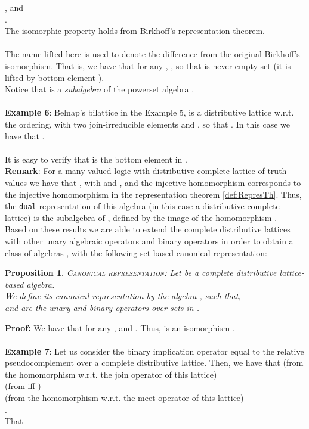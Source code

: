\documentclass[10pt,twocolumn]{article}
\newtheorem{propo}{Proposition}
\begin{document}
,  and \\
. \\
The isomorphic property holds from Birkhoff's representation
theorem.
\\  \\
The name lifted here is used to denote the difference from the
original Birkhoff's isomorphism. That is, we have that for any , , so that  is never
empty set
(it is lifted by bottom element ).\\
Notice that  is a
\emph{subalgebra} of the powerset algebra .\\\\
 \textbf{Example 6}:  Belnap's bilattice in the Example 5, is a
distributive lattice w.r.t. the  ordering, with two join-irreducible elements
   and , so that .
 In this case we have that .
\\\\
 It is easy to verify that  is the bottom element
in .\\
\textbf{Remark}: For a many-valued logic with distributive complete
lattice of truth values we have that , with  and , and the injective
homomorphism  corresponds to the
injective homomorphism  in the representation theorem
\ref{def:RepresTh}. Thus, the \verb"dual" representation of this
algebra (in this case a distributive complete lattice) 
is the subalgebra
  of , defined by the image of the homomorphism .\\
 Based on these results we are able to extend the complete distributive lattices with other
 unary algebraic operators  and binary operators  in order to obtain a class of algebras
 ,
 with the following set-based canonical representation:
\begin{propo} \textsc{Canonical representation:} \label{prop:canonic}
 Let  be a complete distributive lattice-based algebra. \\ We define
its
 canonical representation by the algebra , such that,\\  and  are the unary and
binary  operators over sets in .
\end{propo}
\textbf{Proof:} We have that for any ,  and
. Thus,  is an isomorphism
. \\  \\
\textbf{Example 7}: Let us consider the binary implication operator
 equal to the relative pseudocomplement 
over a complete distributive lattice. Then, we have that
 (from the homomorphism  w.r.t.
the join operator of this lattice)\\  (from
 iff )\\  (from the homomorphism  w.r.t. the meet operator of this lattice)\\ . \\That
\end{document}
